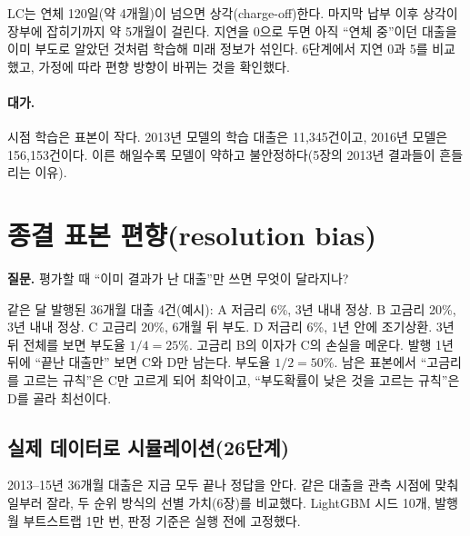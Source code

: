 \begin{whybox}[왜 5개월인가]
LC는 연체 120일(약 4개월)이 넘으면 상각(charge-off)한다. 마지막 납부 이후 상각이 장부에 잡히기까지 약 5개월이 걸린다. 지연을 0으로 두면 아직 ``연체 중''이던 대출을 이미 부도로 알았던 것처럼 학습해 미래 정보가 섞인다. 6단계에서 지연 0과 5를 비교했고, 가정에 따라 편향 방향이 바뀌는 것을 확인했다.
\end{whybox}

\paragraph{대가.} 시점 학습은 표본이 작다. 2013년 모델의 학습 대출은 11,345건이고, 2016년 모델은 156,153건이다. 이른 해일수록 모델이 약하고 불안정하다(5장의 2013년 결과들이 흔들리는 이유).

\section{종결 표본 편향(resolution bias)}
\textbf{질문.} 평가할 때 ``이미 결과가 난 대출''만 쓰면 무엇이 달라지나?

\begin{workout}[4건짜리 종결 편향]
 같은 달 발행된 36개월 대출 4건(예시):
A 저금리 6\%, 3년 내내 정상. B 고금리 20\%, 3년 내내 정상. C 고금리 20\%, 6개월 뒤 부도. D 저금리 6\%, 1년 안에 조기상환.
 3년 뒤 전체를 보면 부도율 $1/4=25\%$. 고금리 B의 이자가 C의 손실을 메운다.
 발행 1년 뒤에 ``끝난 대출만'' 보면 C와 D만 남는다. 부도율 $1/2=50\%$. 
 남은 표본에서 ``고금리를 고르는 규칙''은 C만 고르게 되어 최악이고, ``부도확률이 낮은 것을 고르는 규칙''은 D를 골라 최선이다.
\end{workout}

\subsection*{실제 데이터로 시뮬레이션(26단계)}
2013--15년 36개월 대출은 지금 모두 끝나 정답을 안다. 같은 대출을 관측 시점에 맞춰 일부러 잘라, 두 순위 방식의 선별 가치(6장)를 비교했다. LightGBM 시드 10개, 발행월 부트스트랩 1만 번, 판정 기준은 실행 전에 고정했다.

